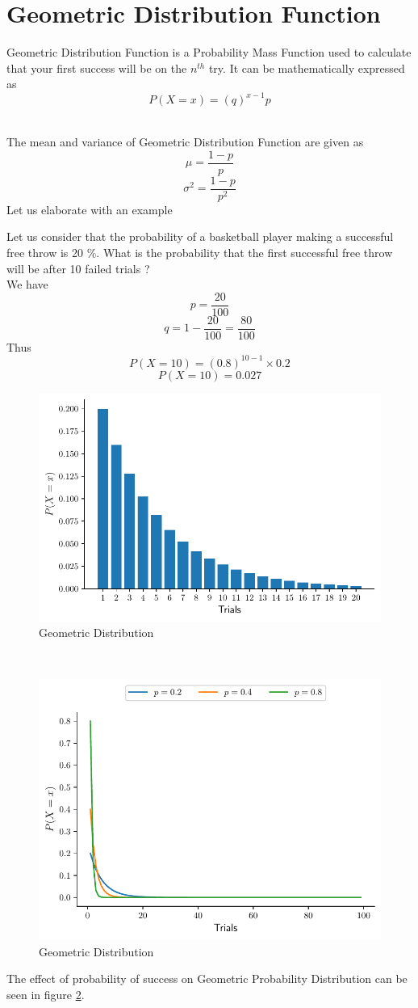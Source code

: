 \documentclass[twoside,12pt]{report}  %
\begin{document}
\section{Geometric Distribution Function}

\begin{tcolorbox}[colback=red!5!white, colframe=red!75!black, title = \textbf{Geometric Distribution}]
	Geometric Distribution Function is a Probability Mass Function used to calculate that your first success will be on the $n^{th}$ try. It can be mathematically expressed as
	$$\boxed{P(X = x) = (q)^{x-1}p} $$ 
\end{tcolorbox}
\noindent
\\
The mean and variance of Geometric Distribution Function are given as
$$ \boxed{\mu =  \frac{1-p}{p}}$$
$$\boxed{\sigma^2 = \frac{1-p}{p^2}}$$
Let us elaborate with an example
\\
\begin{tcolorbox}[colback=blue!5!white, colframe=blue!75!black, title = \textbf{Geometric Distribution}]
	Let us consider that the probability of a basketball player making a successful free throw is 20 \%. What is the probability that the first successful free throw will be after 10 failed trials ?
	\\
	We have
	$$ p = \frac{20}{100} $$
	$$ q = 1 - \frac{20}{100} = \frac{80}{100}$$
	Thus
	$$ P(X = 10) = (0.8)^{10-1} \times 0.2 $$
	$$ P(X = 10) = 0.027 $$
	
	\begin{figure}[H]
		\centering
		\includegraphics[width=0.5\linewidth]{./images/geometric_example.pdf}
		\caption{Geometric Distribution}
		\label{figure_geometric_example}
	\end{figure}
	
\end{tcolorbox}
\noindent
\\
\begin{figure}[H]
	\centering
	\includegraphics[width=0.5\linewidth]{./images/geometric_example_p.pdf}
	\caption{Geometric Distribution}
	\label{figure_geometric_example_p}
\end{figure}
\noindent
The effect of probability of success on Geometric Probability Distribution can be seen in figure \ref{figure_geometric_example_p}.
\end{document}
